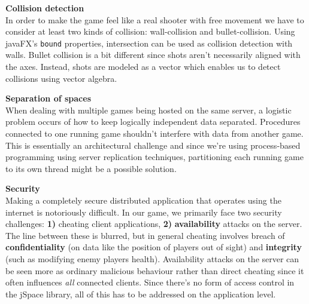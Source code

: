 \textbf{Collision detection}\\
In order to make the game feel like a real shooter with free movement we have to consider at least two kinds of collision: wall-collision and bullet-collision. Using javaFX's \texttt{bound} properties, intersection can be used as collision detection with walls. Bullet collision is a bit different since shots aren't necessarily aligned with the axes. Instead, shots are modeled as a vector which enables us to detect collisions using vector algebra.       

\textbf{Separation of spaces}\\
When dealing with multiple games being hosted on the same server, a logistic problem occurs of how to keep logically independent data separated. Procedures connected to one running game shouldn't interfere with data from another game. This is essentially an architectural challenge and since we're using process-based programming using server replication techniques, partitioning each running game to its own thread might be a possible solution.


\textbf{Security}\\
Making a completely secure distributed application that operates using the internet is notoriously difficult. In our game, we primarily face two security challenges: \textbf{1)} cheating client applications, \textbf{2)} \textbf{availability} attacks on the server. The line between these is blurred, but in general cheating involves breach of \textbf{confidentiality} (on data like the position of players out of sight) and \textbf{integrity} (such as modifying enemy players health). Availability attacks on the server can be seen more as ordinary malicious behaviour rather than direct cheating since it often influences \textit{all} connected clients. Since there's no form of access control in the jSpace library, all of this has to be addressed on the application level.     

